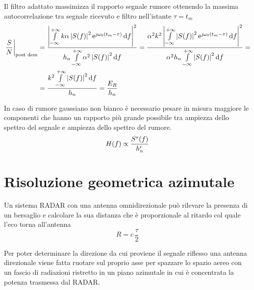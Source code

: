 Il filtro adattato massimizza il rapporto segnale rumore ottenendo la massima autocorrelazione tra segnale ricevuto e filtro nell'istante $\tau=t_m$
\begin{equation}\begin{split}
\left.{\frac{S}{N}}\right\rvert_{\text{post dem}}&=\dfrac{\left|{\int\limits_{-\infty}^{+\infty}{k\alpha\left|{S(f)}\right|^2\operatorname{e}^{\jmath\omega_0(t_m-\tau)}}{\,\mathop{}\!\mathrm{d}{f}}}\right|^2}{h_n\int\limits_{-\infty}^{+\infty}{\alpha^2\left|{S(f)}\right|^2}{\,\mathop{}\!\mathrm{d}{f}}}=\dfrac{\alpha^2 k^2\left|{\int\limits_{-\infty}^{+\infty}{\left|{S(f)}\right|^2\operatorname{e}^{\jmath\omega_0(t_m-\tau)}}{\,\mathop{}\!\mathrm{d}{f}}}\right|^2}{\alpha^2 h_n\int\limits_{-\infty}^{+\infty}{\left|{S(f)}\right|^2}{\,\mathop{}\!\mathrm{d}{f}}}=\\
&=\frac{k^2\int\limits_{-\infty}^{+\infty}{\left|{S(f)}\right|^2}{\,\mathop{}\!\mathrm{d}{f}}}{h_n}=\frac{E_R}{h_n}
\end{split}\end{equation}

In caso di rumore gaussiano non bianco è necessario pesare in misura maggiore le componenti che hanno un rapporto più grande possibile tra ampiezza dello spettro del segnale e ampiezza dello spettro del rumore.
\begin{equation}
H(f)\propto\frac{{S}^\ast(f)}{h'_n}
\label{eq:radar_filtro_adattato_rumore_colorato}
\end{equation}

\section{Risoluzione geometrica azimutale}
Un sistema \ac{RADAR} con una antenna omnidirezionale può rilevare la presenza di un bersaglio e calcolare la sua distanza che è proporzionale al ritardo col quale l'eco torna all'antenna
\begin{equation}
R=c\,\frac{\tau}{2}
\end{equation}

Per poter determinare la direzione da cui proviene il segnale riflesso una antenna direzionale viene fatta ruotare sul proprio asse per spazzare lo spazio aereo con un fascio di radiazioni ristretto in un piano azimutale in cui è concentrata la potenza trasmessa dal \ac{RADAR}.

